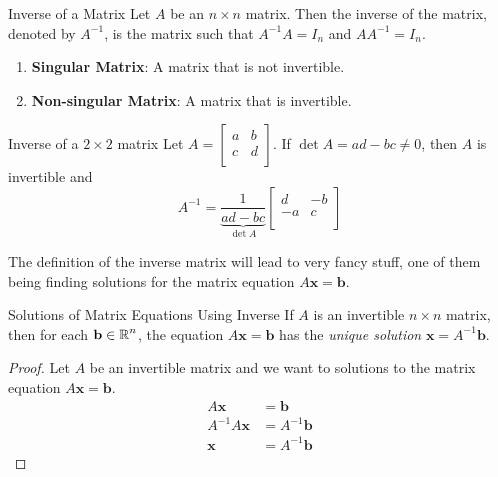 \documentclass{article}
\begin{document}
\begin{definition}{Inverse of a Matrix}
	Let $A$ be an $n \times n$ matrix. Then the inverse of the matrix, denoted by $A^{-1}$, is the matrix such that $A^{-1}A = I_n$ and $AA^{-1} = I_n$.

	\begin{enumerate}[label=\alph*)]
		\item
		      \textbf{Singular Matrix}: A matrix that is not invertible.
		\item
		      \textbf{Non-singular Matrix}: A matrix that is invertible.
	\end{enumerate}
\end{definition}

\begin{theorem}{Inverse of a $2 \times 2$ matrix}
	Let $A = \begin{bmatrix}
			a & b \\
			c & d \\
		\end{bmatrix}$. If $\det A = ad - bc \neq 0$, then $A$ is invertible and
	$$
		A^{-1} = \underbrace{\frac{1}{ad - bc}}_{\det A} \begin{bmatrix}
			d  & -b \\
			-a & c  \\
		\end{bmatrix}
	$$
\end{theorem}

The definition of the inverse matrix will lead to very fancy stuff, one of them being finding solutions for the matrix equation $A\mathbf{x} = \mathbf{b}$.

\begin{theorem}{Solutions of Matrix Equations Using Inverse}
	If $A$ is an invertible $n \times n$ matrix, then for each $\mathbf{b} \in \operatorname{\mathbb{R}}^n$, the equation $A\mathbf{x} = \mathbf{b}$ has the \emph{unique solution} $\mathbf{x} = A^{-1}\mathbf{b}$.

\end{theorem}
\begin{proof}{}
	Let $A$ be an invertible matrix and we want to solutions to the matrix equation $A\mathbf{x} = \mathbf{b}$.
	\begin{equation}
		\begin{split}
			A\mathbf{x}       & = \mathbf{b}       \\
			A^{-1}A\mathbf{x} & = A^{-1}\mathbf{b} \\
			\mathbf{x}        & = A^{-1}\mathbf{b}
		\end{split}
	\end{equation}
\end{proof}
\end{document}
